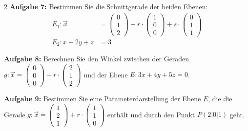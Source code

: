 \documentclass[12pt,a4paper]{article}
\newcommand{\vek}[1]{\vec{#1}}
\begin{document}
\begin{multicols}{2}
\textbf{Aufgabe 7:} Bestimmen Sie die Schnittgerade der beiden Ebenen:
\begin{align*}
E_1: \vek{x} &= \begin{pmatrix}0\\1\\2\end{pmatrix} + r \cdot \begin{pmatrix}1\\0\\0\end{pmatrix} + s \cdot \begin{pmatrix}0\\1\\1\end{pmatrix} \\
E_2: x - 2y + z &= 3
\end{align*}

\vspace{3cm}

\textbf{Aufgabe 8:} Berechnen Sie den Winkel zwischen der Geraden $g: \vek{x} = \begin{pmatrix}0\\0\\0\end{pmatrix} + r \cdot \begin{pmatrix}2\\1\\2\end{pmatrix}$ und der Ebene $E: 3x + 4y + 5z = 0$.

\vspace{3cm}

\textbf{Aufgabe 9:} Bestimmen Sie eine Parameterdarstellung der Ebene $E$, die die Gerade $g: \vek{x} = \begin{pmatrix}1\\2\\1\end{pmatrix} + r \cdot \begin{pmatrix}1\\1\\0\end{pmatrix}$ enthält und durch den Punkt $P(2|0|1)$ geht.

\vspace{3cm}


\end{multicols}
\end{document}
